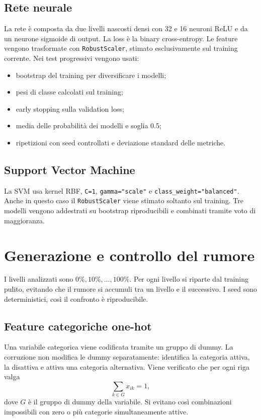 \documentclass[11pt,a4paper]{article}
\begin{document}
\subsection{Rete neurale}

La rete è composta da due livelli nascosti densi con 32 e 16 neuroni ReLU e da un neurone sigmoide di output. La loss è la binary cross-entropy. Le feature vengono trasformate con \texttt{RobustScaler}, stimato esclusivamente sul training corrente. Nei test progressivi vengono usati:
\begin{itemize}
    \item bootstrap del training per diversificare i modelli;
    \item pesi di classe calcolati sul training;
    \item early stopping sulla validation loss;
    \item media delle probabilità dei modelli e soglia 0.5;
    \item ripetizioni con seed controllati e deviazione standard delle metriche.
\end{itemize}

\subsection{Support Vector Machine}

La SVM usa kernel RBF, \texttt{C=1}, \texttt{gamma="scale"} e \texttt{class\_weight="balanced"}. Anche in questo caso il \texttt{RobustScaler} viene stimato soltanto sul training. Tre modelli vengono addestrati su bootstrap riproducibili e combinati tramite voto di maggioranza.

\section{Generazione e controllo del rumore}

I livelli analizzati sono $0\%,10\%,\ldots,100\%$. Per ogni livello si riparte dal training pulito, evitando che il rumore si accumuli tra un livello e il successivo. I seed sono deterministici, così il confronto è riproducibile.

\subsection{Feature categoriche one-hot}

Una variabile categorica viene codificata tramite un gruppo di dummy. La corruzione non modifica le dummy separatamente: identifica la categoria attiva, la disattiva e attiva una categoria alternativa. Viene verificato che per ogni riga valga
\[
\sum_{k \in G} x_{ik}=1,
\]
dove $G$ è il gruppo di dummy della variabile. Si evitano così combinazioni impossibili con zero o più categorie simultaneamente attive.
\end{document}
